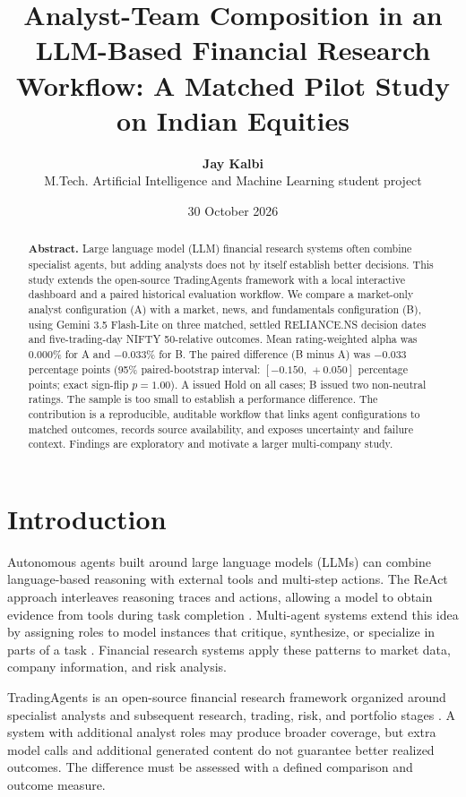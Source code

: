 \documentclass[10pt]{article}
\title{\vspace{-1.2em}\textbf{Analyst-Team Composition in an LLM-Based Financial Research Workflow: A Matched Pilot Study on Indian Equities}}
\author{\textbf{Jay Kalbi}\\
\small M.Tech. Artificial Intelligence and Machine Learning student project}
\date{\small 30 October 2026}
\begin{document}
\maketitle
\vspace{-1.2em}
\begin{abstract}
\noindent\textbf{Abstract.} Large language model (LLM) financial research systems often combine specialist agents, but adding analysts does not by itself establish better decisions. This study extends the open-source TradingAgents framework with a local interactive dashboard and a paired historical evaluation workflow. We compare a market-only analyst configuration (A) with a market, news, and fundamentals configuration (B), using Gemini 3.5 Flash-Lite on three matched, settled RELIANCE.NS decision dates and five-trading-day NIFTY 50-relative outcomes. Mean rating-weighted alpha was 0.000\% for A and $-0.033\%$ for B. The paired difference (B minus A) was $-0.033$ percentage points (95\% paired-bootstrap interval: $[-0.150,\,+0.050]$ percentage points; exact sign-flip $p=1.00$). A issued Hold on all cases; B issued two non-neutral ratings. The sample is too small to establish a performance difference. The contribution is a reproducible, auditable workflow that links agent configurations to matched outcomes, records source availability, and exposes uncertainty and failure context. Findings are exploratory and motivate a larger multi-company study.
\end{abstract}

\section{Introduction}
Autonomous agents built around large language models (LLMs) can combine language-based reasoning with external tools and multi-step actions. The ReAct approach interleaves reasoning traces and actions, allowing a model to obtain evidence from tools during task completion \citep{yao2023react}. Multi-agent systems extend this idea by assigning roles to model instances that critique, synthesize, or specialize in parts of a task \citep{du2023debate}. Financial research systems apply these patterns to market data, company information, and risk analysis.

TradingAgents is an open-source financial research framework organized around specialist analysts and subsequent research, trading, risk, and portfolio stages \citep{xiao2025tradingagents}. A system with additional analyst roles may produce broader coverage, but extra model calls and additional generated content do not guarantee better realized outcomes. The difference must be assessed with a defined comparison and outcome measure.
\end{document}
